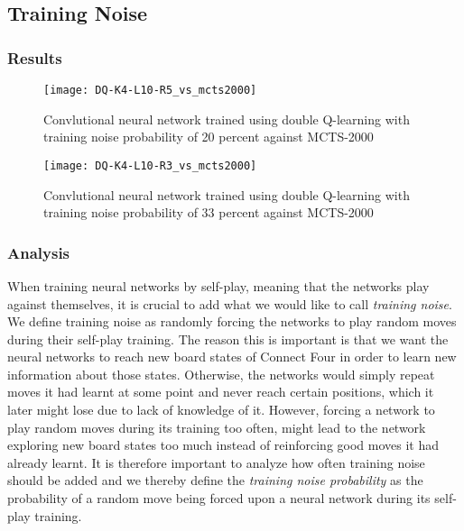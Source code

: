 \documentclass[titlepage]{article}
\begin{document}
\newpage

\subsection{Training Noise}

\subsubsection{Results}

\vskip -0.7cm

\begin{figure}[h]
    \center
    \texttt{[image: DQ-K4-L10-R5\_vs\_mcts2000]}
    \caption{\scriptsize Convlutional neural network trained using double Q-learning with training noise probability of 20 percent against MCTS-2000}
\end{figure}

\vskip 0.2cm

\begin{figure}[h]
    \center
    \texttt{[image: DQ-K4-L10-R3\_vs\_mcts2000]}
    \caption{\scriptsize Convlutional neural network trained using double Q-learning with training noise probability of \scalebox{0.7}{$(\approx)$} 33 percent against MCTS-2000}
\end{figure}

\newpage

\subsubsection{Analysis}

\vskip 0.2cm

\noindent
When training neural networks by self-play, meaning that the networks play against themselves, it is crucial to add what we would like to call \emph{training noise}. We define training noise as randomly forcing the networks to play random moves during their self-play training. The reason this is important is that we want the neural networks to reach new board states of Connect Four in order to learn new information about those states. Otherwise, the networks would simply repeat moves it had learnt at some point and never reach certain positions, which it later might lose due to lack of knowledge of it. However, forcing a network to play random moves during its training too often, might lead to the network exploring new board states too much instead of reinforcing good moves it had already learnt. It is therefore important to analyze how often training noise should be added and we thereby define the \emph{training noise probability} as the probability of a random move being forced upon a neural network during its self-play training. 
\end{document}
